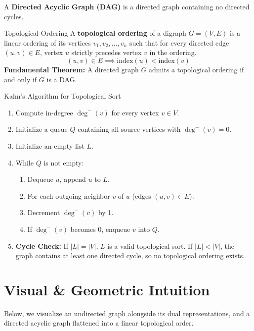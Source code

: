 A \textbf{Directed Acyclic Graph (DAG)} is a directed graph containing no directed cycles.

\begin{definitionbox}{Topological Ordering}
A \textbf{topological ordering} of a digraph $G = (V, E)$ is a linear ordering of its vertices $v_1, v_2, \dots, v_n$ such that for every directed edge $(u, v) \in E$, vertex $u$ strictly precedes vertex $v$ in the ordering.
\begin{equation}
(u, v) \in E \implies \text{index}(u) < \text{index}(v)
\end{equation}
\textbf{Fundamental Theorem:} A directed graph $G$ admits a topological ordering if and only if $G$ is a DAG.
\end{definitionbox}

\begin{theorembox}{Kahn's Algorithm for Topological Sort}
\begin{enumerate}
    \item Compute in-degree $\deg^-(v)$ for every vertex $v \in V$.
    \item Initialize a queue $Q$ containing all source vertices with $\deg^-(v) = 0$.
    \item Initialize an empty list $L$.
    \item While $Q$ is not empty:
    \begin{enumerate}
        \item Dequeue $u$, append $u$ to $L$.
        \item For each outgoing neighbor $v$ of $u$ (edges $(u, v) \in E$):
        \item Decrement $\deg^-(v)$ by 1.
        \item If $\deg^-(v)$ becomes 0, enqueue $v$ into $Q$.
    \end{enumerate}
    \item \textbf{Cycle Check:} If $|L| = |V|$, $L$ is a valid topological sort. If $|L| < |V|$, the graph contains at least one directed cycle, so no topological ordering exists.
\end{enumerate}
\end{theorembox}

\section{Visual \& Geometric Intuition}

Below, we visualize an undirected graph alongside its dual representations, and a directed acyclic graph flattened into a linear topological order.

